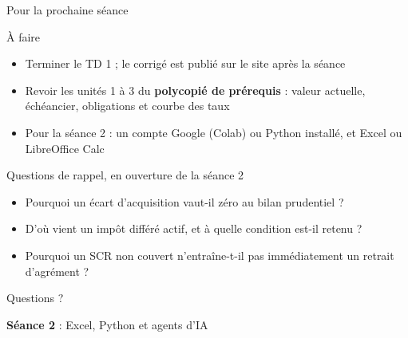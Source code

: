 \documentclass[10pt,aspectratio=169]{beamer}
\begin{document}
\begin{frame}{Pour la prochaine séance}
\begin{block}{À faire}
\begin{itemize}
  \item Terminer le TD 1 ; le corrigé est publié sur le site après la séance
  \item Revoir les unités 1 à 3 du \textbf{polycopié de prérequis} : valeur actuelle, échéancier,
        obligations et courbe des taux
  \item Pour la séance 2 : un compte Google (Colab) ou Python installé, et Excel ou LibreOffice Calc
\end{itemize}
\end{block}
\begin{block}{Questions de rappel, en ouverture de la séance 2}
\begin{itemize}
  \item Pourquoi un écart d'acquisition vaut-il zéro au bilan prudentiel ?
  \item D'où vient un impôt différé actif, et à quelle condition est-il retenu ?
  \item Pourquoi un SCR non couvert n'entraîne-t-il pas immédiatement un retrait d'agrément ?
\end{itemize}
\end{block}
\end{frame}

\begin{frame}[c]
\centering
\Huge Questions ?

\vspace{1cm}
\Large
\textbf{Séance 2} : Excel, Python et agents d'IA
\end{frame}
\end{document}

